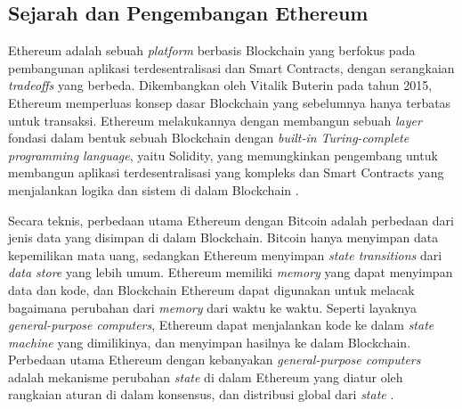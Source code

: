 \subsection{Sejarah dan Pengembangan Ethereum}
\label{subsec:sejarah-pengembangan-ethereum}


Ethereum adalah sebuah \textit{platform} berbasis Blockchain yang berfokus pada pembangunan aplikasi terdesentralisasi dan Smart Contracts, dengan serangkaian \textit{tradeoffs} yang berbeda. 
Dikembangkan oleh Vitalik Buterin pada tahun 2015, Ethereum memperluas konsep dasar Blockchain yang sebelumnya hanya terbatas untuk transaksi. Ethereum melakukannya dengan membangun sebuah \textit{layer} fondasi dalam bentuk sebuah Blockchain dengan \textit{built-in Turing-complete programming language}, yaitu Solidity, yang memungkinkan pengembang untuk membangun aplikasi terdesentralisasi yang kompleks dan Smart Contracts yang menjalankan logika dan sistem di dalam Blockchain \parencite{buterin2013ethereum}. 

Secara teknis, perbedaan utama Ethereum dengan Bitcoin adalah perbedaan dari jenis data yang disimpan di dalam Blockchain. Bitcoin hanya menyimpan data kepemilikan mata uang, sedangkan Ethereum menyimpan \textit{state transitions} dari \textit{data store} yang lebih umum. Ethereum memiliki \textit{memory} yang dapat menyimpan data dan kode, dan Blockchain Ethereum dapat digunakan untuk melacak bagaimana perubahan dari \textit{memory} dari waktu ke waktu. Seperti layaknya \textit{general-purpose computers}, Ethereum dapat menjalankan kode ke dalam \textit{state machine} yang dimilikinya, dan menyimpan hasilnya ke dalam Blockchain. Perbedaan utama Ethereum dengan kebanyakan \textit{general-purpose computers} adalah mekanisme perubahan \textit{state} di dalam Ethereum yang diatur oleh rangkaian aturan di dalam konsensus, dan distribusi global dari \textit{state} \parencite{antonopoulos2018mastering}.





